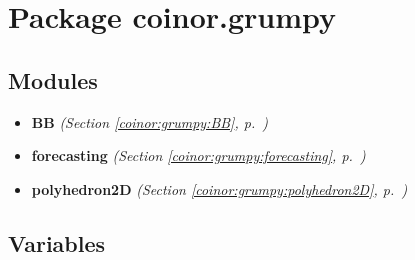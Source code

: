 %
%
%


\section{Package coinor.grumpy}

    \label{coinor:grumpy}


\subsection{Modules}

\begin{itemize}
\setlength{\parskip}{0ex}
\item \textbf{BB}
  \textit{(Section \ref{coinor:grumpy:BB}, p.~\pageref{coinor:grumpy:BB})}

\item \textbf{forecasting}
  \textit{(Section \ref{coinor:grumpy:forecasting}, p.~\pageref{coinor:grumpy:forecasting})}

\item \textbf{polyhedron2D}
  \textit{(Section \ref{coinor:grumpy:polyhedron2D}, p.~\pageref{coinor:grumpy:polyhedron2D})}

\end{itemize}



  \subsection{Variables}

